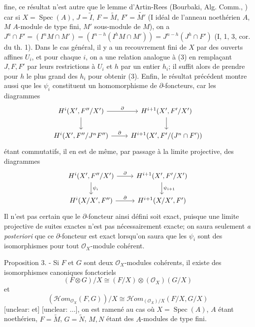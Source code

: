 fine, ce résultat n'est autre que le lemme d'Artin-Rees (Bourbaki,
Alg. Comm., ) car si $X=\operatorname{Spec}(A)$, $J=\tilde{I}$, $F=\tilde{M}$, $F'=\tilde{M'}$ (I idéal de
l'anneau noethérien $A$, $M$ $A$-module de type fini, $M'$ sous-module de
$M$), on a $J^n \cap F' = (I^n M \cap M') = (I^{n-h}(I^h M \cap M')) = J^{n-h}(J^h \cap F')$ (I, 1, 3,
cor. du th. 1). Dans le cas général, il y a un recouvrement fini
de $X$ par des ouverts affines $U_i$, et pour chaque $i$, on a une relation analogue à (3) en remplaçant $J, F, F'$ par leurs restrictions à $U_i$
et $h$ par un entier $h_i$; il suffit alors de prendre pour $h$ le plus
grand des $h_i$ pour obtenir (3). Enfin, le résultat précédent montre
aussi que les $\psi_i$ constituent un homomorphisme de $\partial$-foncteurs,
car les diagrammes
$$\begin{tikzcd}
H^i(X', F''/X') \arrow[r, "\partial"] \arrow[d] & H^{i+1}(X', F'/X') \arrow[d] \\
H^i(X', F''/J^nF'') \arrow[r, "\partial"] & H^{i+1}(X', F'/(J^n \cap F'))
\end{tikzcd}$$
étant commutatifs, il en est de même, par passage à la limite projective, des diagrammes
$$\begin{tikzcd}
H^i(X', F''/X') \arrow[r, "\partial"] \arrow[d, "\psi_i"] & H^{i+1}(X', F'/X') \arrow[d, "\psi_{i+1}"] \\
H^i(X/X', F'') \arrow[r, "\partial"] & H^{i+1}(X/X', F')
\end{tikzcd}$$
Il n'est pas certain que le $\partial$-foncteur ainsi défini soit exact,
puisque une limite projective de suites exactes n'est pas nécessairement exacte; on saura seulement \emph{a posteriori} que ce $\partial$-foncteur est
exact lorsqu'on saura que les $\psi_i$ sont des isomorphismes pour tout
$\mathcal{O}_X$-module cohérent.

Proposition 3. - Si $F$ et $G$ sont deux $\mathcal{O}_X$-modules cohérents, il existe
des isomorphismes canoniques fonctoriels
$$(F \otimes G)/X \cong (F/X) \otimes (\mathcal{O}_X) (G/X)$$
et
$$(\mathcal{H}om_{\mathcal{O}_X}(F, G))/X \cong \mathcal{H}om_{(\mathcal{O}_X)/X} (F/X, G/X)$$
[unclear: et] [unclear: ...], on est ramené au cas où $X=\operatorname{Spec}(A)$,
$A$ étant noethérien, $F=\tilde{M}$, $G=\tilde{N}$, $M, N$ étant des $A$-modules de type fini.


\newpage


